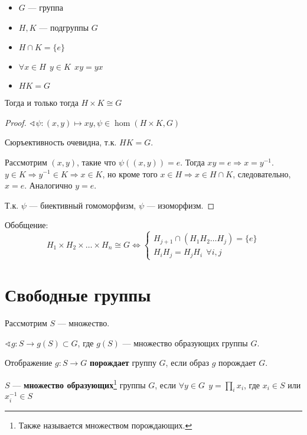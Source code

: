 \begin{lemma}\itemfix
    \begin{itemize}
        \item \(G\) --- группа
        \item \(H, K\) --- подгруппы \(G\)
        \item \(H \cap K = \{e\}\)
        \item \(\forall x \in H \ \ y \in K \ \ xy = yx\)
        \item \(HK = G\)
    \end{itemize}

    Тогда и только тогда \(H \times K \cong G\)
\end{lemma}
\begin{proof}
    \(\sphericalangle \psi : (x, y) \mapsto xy, \psi \in \hom(H \times K, G)\)

    Сюръективность очевидна, т.к. \(HK = G\).

    Рассмотрим \((x, y)\), такие что \(\psi((x, y)) = e\). Тогда \(xy = e \Rightarrow x = y^{-1}\). \(y \in K \Rightarrow y^{-1} \in K \Rightarrow x \in K\), но кроме того \(x \in H \Rightarrow x \in H \cap K\), следовательно, \(x = e\). Аналогично \(y = e\).

    Т.к. \(\psi\) --- биективный гомоморфизм, \(\psi\) --- изоморфизм.
\end{proof}

Обобщение:
\[H_1 \times H_2 \times \dots \times H_n \cong G \Leftrightarrow \begin{cases}
        H_{j+1} \cap (H_1 H_2 \dots H_j) = \{e\} \\
        H_i H_j = H_j H_i \ \ \forall i, j
    \end{cases}\]

\section{Свободные группы}

Рассмотрим \(S\) --- множество.

\(\sphericalangle g : S \to g(S) \subset G\), где \(g(S)\) --- множество образующих группы \(G\).

\begin{definition}
    Отображение \(g : S \to G\) \textbf{порождает} группу \(G\), если образ \(g\) порождает \(G\).
\end{definition}

\begin{definition}
    \(S\) --- \textbf{множество образующих}\footnote{Также называется множеством порождающих.} группы \(G\), если \(\forall y \in G \ \ y = \prod_i x_i\), где \(x_i \in S\) или \(x_i^{-1} \in S\)
\end{definition}

\unfinished
